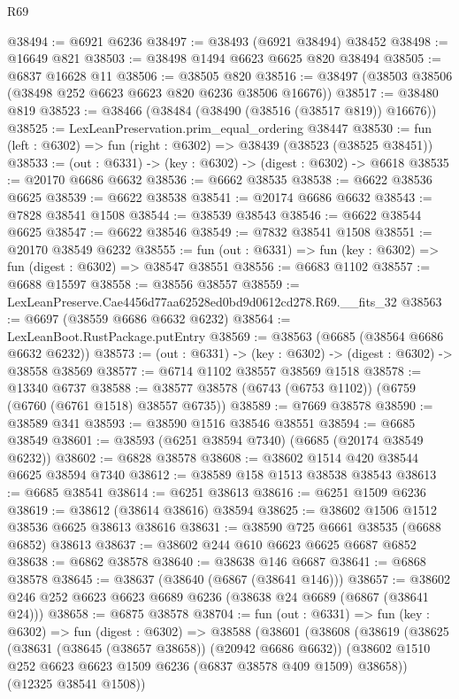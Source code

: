 \begin{lexlean}{R69}
\begin{coremodule}
{@38494 := @6921 @6236
@38497 := @38493 (@6921 @38494) @38452
@38498 := @16649 @821
@38503 := @38498 @1494 @6623 @6625 @820 @38494
@38505 := @6837 @16628 @11
@38506 := @38505 @820
@38516 := @38497 (@38503 @38506 (@38498 @252 @6623 @6623 @820 @6236 @38506 @16676))
@38517 := @38480 @819
@38523 := @38466 (@38484 (@38490 (@38516 (@38517 @819)) @16676))
@38525 := LexLeanPreservation.prim_equal_ordering @38447
@38530 := fun (left : @6302) => fun (right : @6302) => @38439 (@38523 (@38525 @38451))
@38533 := (out : @6331) -> (key : @6302) -> (digest : @6302) -> @6618
@38535 := @20170 @6686 @6632
@38536 := @6662 @38535
@38538 := @6622 @38536 @6625
@38539 := @6622 @38538
@38541 := @20174 @6686 @6632
@38543 := @7828 @38541 @1508
@38544 := @38539 @38543
@38546 := @6622 @38544 @6625
@38547 := @6622 @38546
@38549 := @7832 @38541 @1508
@38551 := @20170 @38549 @6232
@38555 := fun (out : @6331) => fun (key : @6302) => fun (digest : @6302) => @38547 @38551
@38556 := @6683 @1102
@38557 := @6688 @15597
@38558 := @38556 @38557
@38559 := LexLeanPreserve.Cae4456d77aa62528ed0bd9d0612cd278.R69.__fits_32
@38563 := @6697 (@38559 @6686 @6632 @6232)
@38564 := LexLeanBoot.RustPackage.putEntry
@38569 := @38563 (@6685 (@38564 @6686 @6632 @6232))
@38573 := (out : @6331) -> (key : @6302) -> (digest : @6302) -> @38558 @38569
@38577 := @6714 @1102 @38557 @38569 @1518
@38578 := @13340 @6737
@38588 := @38577 @38578 (@6743 (@6753 @1102)) (@6759 (@6760 (@6761 @1518) @38557 @6735))
@38589 := @7669 @38578
@38590 := @38589 @341
@38593 := @38590 @1516 @38546 @38551
@38594 := @6685 @38549
@38601 := @38593 (@6251 @38594 @7340) (@6685 (@20174 @38549 @6232))
@38602 := @6828 @38578
@38608 := @38602 @1514 @420 @38544 @6625 @38594 @7340
@38612 := @38589 @158 @1513 @38538 @38543
@38613 := @6685 @38541
@38614 := @6251 @38613
@38616 := @6251 @1509 @6236
@38619 := @38612 (@38614 @38616) @38594
@38625 := @38602 @1506 @1512 @38536 @6625 @38613 @38616
@38631 := @38590 @725 @6661 @38535 (@6688 @6852) @38613
@38637 := @38602 @244 @610 @6623 @6625 @6687 @6852
@38638 := @6862 @38578
@38640 := @38638 @146 @6687
@38641 := @6868 @38578
@38645 := @38637 (@38640 (@6867 (@38641 @146)))
@38657 := @38602 @246 @252 @6623 @6623 @6689 @6236 (@38638 @24 @6689 (@6867 (@38641 @24)))
@38658 := @6875 @38578
@38704 := fun (out : @6331) =>
  fun (key : @6302) =>
  fun (digest : @6302) =>
  @38588
    (@38601
      (@38608
        (@38619
          (@38625
            (@38631 (@38645 (@38657 @38658)) (@20942 @6686 @6632))
            (@38602 @1510 @252 @6623 @6623 @1509 @6236 (@6837 @38578 @409 @1509) @38658))
          (@12325 @38541 @1508))
}
\end{coremodule}
\end{lexlean}
